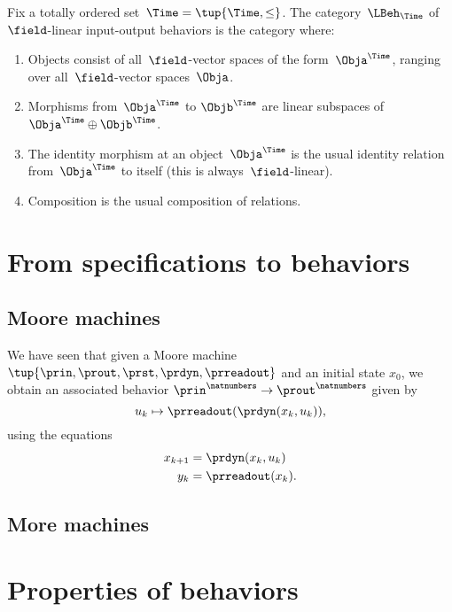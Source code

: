 \begin{definition}
    Fix a totally ordered set~$\Time = \tup{\Time, \leq}$.
    The category~$\LBeh_\Time$ of~$\field$-linear input-output behaviors is the category where:
    \begin{enumerate}
        \item Objects consist of all~$\field$-vector spaces of the form~$\Obja^\Time$, ranging over all~$\field$-vector spaces~$\Obja$.
        \item Morphisms from~$\Obja^\Time$ to $\Objb^\Time$ are linear subspaces of~$\Obja^\Time \oplus \Objb^\Time$.
        \item The identity morphism at an object~$\Obja^\Time$ is the usual identity relation from~$\Obja^\Time$ to itself (this is always~$\field$-linear).
        \item Composition is the usual composition of relations.
    \end{enumerate}
\end{definition}

\section{From specifications to behaviors}


\subsection{Moore machines}

We have seen that given a Moore machine $\tup{\prin, \prout, \prst, \prdyn, \prreadout}$ and an initial state $x_0$, we obtain an associated behavior $\prin^\natnumbers \to  \prout^\natnumbers$ given by
\begin{equation}
    u_k \mapsto \prreadout(\prdyn(x_k, u_k)),
\end{equation}
using the equations
\begin{align}
    x_{k+1} & = \prdyn(x_k, u_k) \\
    y_{k}   & = \prreadout(x_{k}).
\end{align}

\subsection{More machines}

\section{Properties of behaviors}

